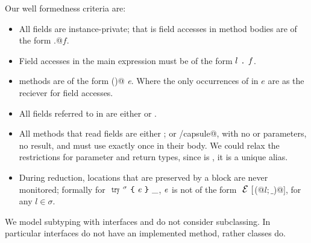 Our well formedness criteria are:
\begin{itemize}
\item All fields are instance-private; that is field accesses in method bodies are of the form
\Q@this.@$f$.

\item Field accesses in the main expression
must be of the form $l{ \mbox{ {\texttt{.}} } }\mathit{f}$.

\item \validate{} methods are of the form \Q@read@ \Q@method@ \Q@Bool@ \Q@invariant()@ \emph{e}.
Where the only occurrences of \Q@this@ in $e$ are as the reciever for field accesses.
\item All fields referred to in \validate{} are either \Q@imm@ or \Q@capsule@.
\item All methods that read \Q@capsule@ fields
are either \Q@read@;
or \Q@mut/capsule@, with no \Q@mut@ or \Q@read@ parameters, no \Q@mut@ result, and 
must use \Q@this@ exactly once in their body. We could relax the restrictions for parameter and return types, since \Q@this@ is \Q@capsule@, it is a unique alias.
\item 
During reduction, locations that are preserved by a \Q@try@ block are
never monitored; formally 
for $\Kw{try}^\sigma\oC\e\cC\_$, ${\mathit{e}}$ is not of the form $\ctx[$\Q@M(@$l;\_$\Q@)@$]$, for any $l\in\sigma$.
\end{itemize}

\noindent We model subtyping with interfaces 
and do not consider subclassing.
In particular interfaces do not have an implemented \validate{} method, rather classes do.
\newcommand{\rowSpace}{\\\vspace{2.5ex}}

